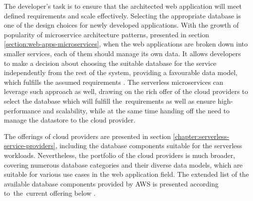 The developer's task is to ensure that the architected web application will meet defined requirements and scale effectively.
Selecting the appropriate database is one of the design choices for newly developed applications.
With the growth of popularity of microservice architecture patterns, presented in section \ref{section:web-apps-microservices}, when the web applications are broken down into smaller services, each of them should manage its own data.
It allows developers to make a decision about choosing the suitable database for the service independently from the rest of the system, providing a favourable data model, which fulfills the assumed requirements \cite{AOneSizeFitsAllDatabaseDoesntFitAnyone}.
The serverless microservices can leverage such approach as well, drawing on the rich offer of the cloud providers to select the database which will fulfill the~requirements as well as ensure high-performance and scalability, while at the same time handing off the need to manage the datastore to the cloud provider.

The offerings of cloud providers are presented in section \ref{chapter:serverless-service-providers}, including the database components suitable for the serverless workloads.
Nevertheless, the portfolio of the cloud providers is much broader, covering numerous database categories and their diverse data models, which are suitable for various use cases in the web application field.
The extended list of the available database components provided by AWS is presented according to~the~current offering below \cite{DatabasesOnAWS}.

